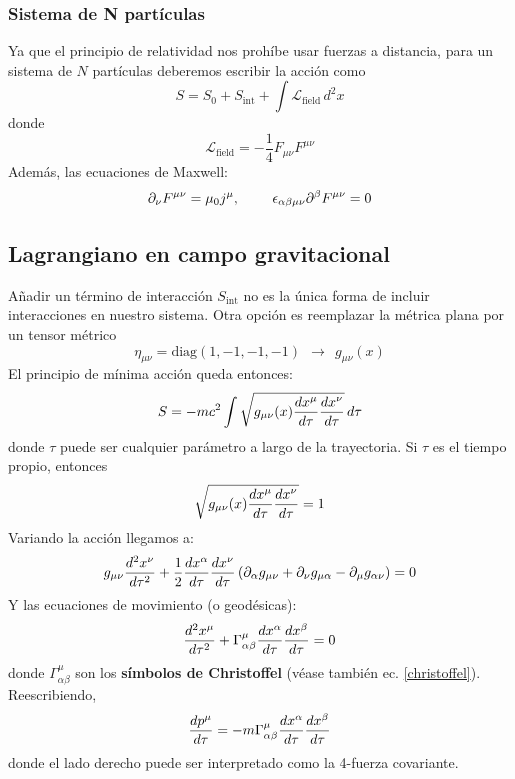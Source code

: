 \documentclass[]{article}
\numberwithin{equation}{section}
\begin{document}
\subsubsection{Sistema de N partículas}
Ya que el principio de relatividad nos prohíbe usar fuerzas a distancia, para un sistema de \(N\) partículas deberemos escribir la acción como
\begin{equation}
	S = S_{0} + S_\mathrm{int} + \int \mathcal{L}_{\mathrm{field}} \, d^2 x
\end{equation}
donde
\begin{equation}
	\mathcal{L}_{\mathrm{field}} = - \frac{1}{4} F_{\mu\nu} F^{\mu\nu}
\end{equation}
Además, las ecuaciones de Maxwell:
\begin{equation}
	\partial_\nu F^{\mu\nu} = \mu_{0} j^\mu, ~~~~~~~ \epsilon_{\alpha\beta\mu\nu} \partial^\beta F^{\mu\nu} = 0
\end{equation}

\subsection{Lagrangiano en campo gravitacional}
Añadir un término de interacción \(S_\mathrm{int}\) no es la única forma de incluir interacciones en nuestro sistema. Otra opción es reemplazar la métrica plana por un tensor métrico
\begin{equation*}
	\eta_{\mu\nu} = \mathrm{diag}(1,-1,-1,-1) ~~\rightarrow~~ g_{\mu\nu}(x)
\end{equation*}
El principio de mínima acción queda entonces:
\begin{equation}
	S = -mc^2 \int \sqrt{g_{\mu\nu}(x) \dfrac{d x^{\mu}}{d \tau} \dfrac{d x^{\nu}}{d \tau}} \, d\tau
\end{equation}
donde \(\tau\) puede ser cualquier parámetro a largo de la trayectoria. Si \(\tau\) es el tiempo propio, entonces
\begin{equation*}
	\sqrt{g_{\mu\nu}(x) \dfrac{d x^{\mu}}{d \tau} \dfrac{d x^{\nu}}{d \tau}} = 1
\end{equation*}
Variando la acción llegamos a:
\begin{equation}
	g_{\mu\nu} \dfrac{d ^2 x^\nu}{d \tau^2} + \frac{1}{2} \dfrac{d x^\alpha}{d \tau} \dfrac{d x^\nu}{d \tau} \left(\partial_\alpha g_{\mu\nu} + \partial_\nu g_{\mu\alpha} - \partial_\mu g_{\alpha\nu}\right) = 0
\end{equation}
Y las ecuaciones de movimiento (o geodésicas):
\begin{equation}
	\dfrac{d ^2 x^\mu}{d \tau^2} + \Gamma^\mu_{\alpha\beta} \dfrac{d x^\alpha}{d \tau} \dfrac{d x^\beta}{d \tau} = 0
\end{equation}
donde \(\Gamma^\mu_{\alpha\beta}\) son los \textbf{símbolos de Christoffel} (véase también ec. \ref{christoffel}). Reescribiendo,
\begin{equation}
	\dfrac{d p^\mu}{d \tau} = -m \Gamma^\mu_{\alpha\beta} \dfrac{d x^\alpha}{d \tau} \dfrac{d x^\beta}{d \tau}
\end{equation}
donde el lado derecho puede ser interpretado como la 4-fuerza covariante.
\end{document}
